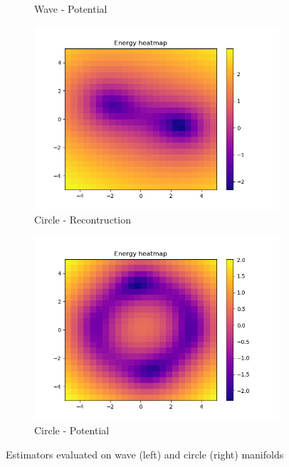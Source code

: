 \begin{figure}[!h]
\begin{subfigure}{.5\textwidth}
  \caption{Wave - Potential}
\end{subfigure}
\begin{subfigure}{.5\textwidth}
  \centering
  \includegraphics[width=.95\linewidth]{figures/wave-quantifier-energy}
  \caption{Circle - Recontruction}
\end{subfigure}%
\begin{subfigure}{.5\textwidth}
  \centering
  \includegraphics[width=.95\linewidth]{figures/circle-quantifier-energy}
  \caption{Circle - Potential}
\end{subfigure}
\caption[Heatmap of estimators on wave and circle manifold]{Estimators evaluated on wave (left) and circle (right) manifolds}
\label{fig:exp1-heatmaps}
\end{figure}


